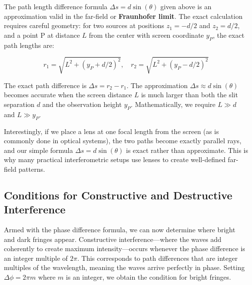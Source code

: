 \documentclass[
  a4paper,
]{book}
\begin{document}
\begin{tcolorbox}[enhanced jigsaw, breakable, toptitle=1mm, bottomrule=.15mm, colbacktitle=quarto-callout-note-color!10!white, title=\textcolor{quarto-callout-note-color}{\faInfo}\hspace{0.5em}{The Fraunhofer Approximation}, arc=.35mm, rightrule=.15mm, bottomtitle=1mm, opacityback=0, toprule=.15mm, coltitle=black, leftrule=.75mm, opacitybacktitle=0.6, colback=white, left=2mm, titlerule=0mm, colframe=quarto-callout-note-color-frame]

The path length difference formula \(\Delta s = d\sin(\theta)\) given
above is an approximation valid in the far-field or \textbf{Fraunhofer
limit}. The exact calculation requires careful geometry: for two sources
at positions \(z_1 = -d/2\) and \(z_2 = d/2\), and a point P at distance
\(L\) from the center with screen coordinate \(y_P\), the exact path
lengths are:

\[r_1 = \sqrt{L^2 + (y_P + d/2)^2}, \quad r_2 = \sqrt{L^2 + (y_P - d/2)^2}\]

The exact path difference is \(\Delta s = r_2 - r_1\). The approximation
\(\Delta s \approx d\sin(\theta)\) becomes accurate when the screen
distance \(L\) is much larger than both the slit separation \(d\) and
the observation height \(y_P\). Mathematically, we require \(L \gg d\)
and \(L \gg y_P\).

Interestingly, if we place a lens at one focal length from the screen
(as is commonly done in optical systems), the two paths become exactly
parallel rays, and our simple formula \(\Delta s = d\sin(\theta)\) is
exact rather than approximate. This is why many practical
interferometric setups use lenses to create well-defined far-field
patterns.

\end{tcolorbox}

\subsection{Conditions for Constructive and Destructive
Interference}\label{conditions-for-constructive-and-destructive-interference}

Armed with the phase difference formula, we can now determine where
bright and dark fringes appear. Constructive interference---where the
waves add coherently to create maximum intensity---occurs whenever the
phase difference is an integer multiple of \(2\pi\). This corresponds to
path differences that are integer multiples of the wavelength, meaning
the waves arrive perfectly in phase. Setting \(\Delta\phi = 2\pi m\)
where \(m\) is an integer, we obtain the condition for bright fringes.
\end{document}
